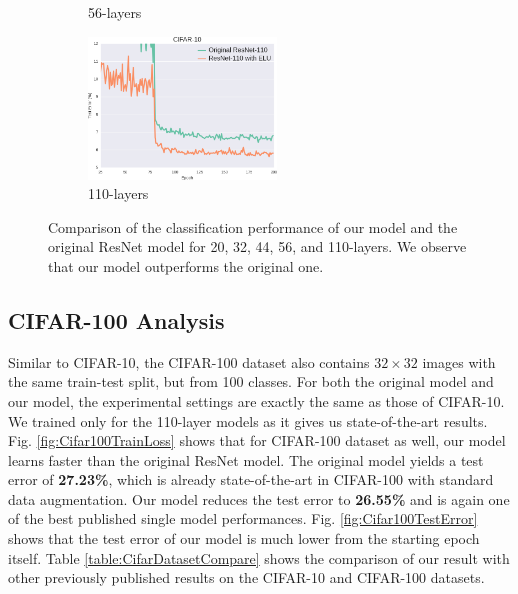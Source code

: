 \documentclass[10pt,twocolumn,letterpaper]{article}
\begin{document}
\begin{figure}
\begin{subfigure}{.4\textwidth}
        \caption{56-layers}
        \label{fig:Cifar10TestError56}
    \end{subfigure}
    \begin{subfigure}{.4\textwidth}
        \centering
        \includegraphics[width=5cm]{TestError110}
        \caption{110-layers}
        \label{fig:Cifar10TestError110}
    \end{subfigure}
    \caption{Comparison of the classification performance of our model and the original ResNet model for 20, 32, 44, 56, and 110-layers. We observe that our model outperforms the original one.}
    \label{fig:Cifar10TestError}
\end{figure}


\subsection{CIFAR-100 Analysis}

Similar to CIFAR-10, the CIFAR-100 dataset \cite{[10]} also contains $32 \times 32$ images with the same train-test split, but from 100 classes. For both the original model and our model, the experimental settings are exactly the same as those of CIFAR-10. We trained only for the 110-layer models as it gives us state-of-the-art results. Fig. \ref{fig:Cifar100TrainLoss} shows that for CIFAR-100 dataset as well, our model learns faster than the original ResNet model. The original model yields a test error of \textbf{27.23\%}, which is already state-of-the-art in CIFAR-100 with standard data augmentation. Our model reduces the test error to \textbf{26.55\%} and is again one of the best published single model performances. Fig. \ref{fig:Cifar100TestError} shows that the test error of our model is much lower from the starting epoch itself. Table \ref{table:CifarDatasetCompare} shows the comparison of our result with other previously published results on the CIFAR-10 and CIFAR-100 datasets.
\end{document}
